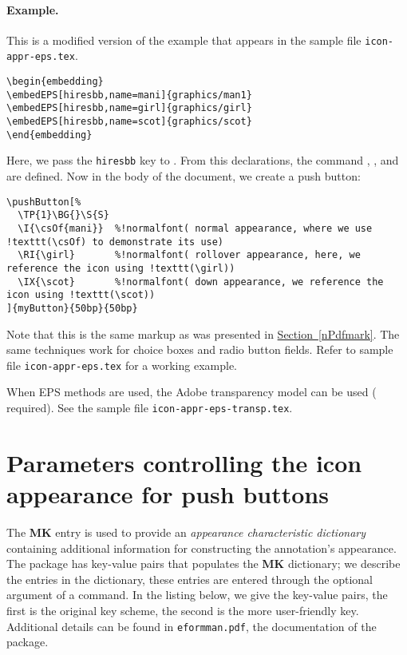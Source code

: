 \documentclass{article}
\begin{document}
\paragraph*{Example.} This is a modified version of the example that appears in the sample
file \texttt{icon-appr-eps.tex}.
\begin{Verbatim}[xleftmargin=\parindent,fontsize=\small]
\begin{embedding}
\embedEPS[hiresbb,name=mani]{graphics/man1}
\embedEPS[hiresbb,name=girl]{graphics/girl}
\embedEPS[hiresbb,name=scot]{graphics/scot}
\end{embedding}
\end{Verbatim}
Here, we pass the \texttt{hiresbb} key to .
From this declarations, the command , , and  are
defined. Now in the body of the document, we create a push button:
\begin{Verbatim}[xleftmargin=\parindent,commandchars=!(),fontsize=\small]
\pushButton[%
  \TP{1}\BG{}\S{S}
  \I{\csOf{mani}}  %!normalfont( normal appearance, where we use !texttt(\csOf) to demonstrate its use)
  \RI{\girl}       %!normalfont( rollover appearance, here, we reference the icon using !texttt(\girl))
  \IX{\scot}       %!normalfont( down appearance, we reference the icon using !texttt(\scot))
]{myButton}{50bp}{50bp}
\end{Verbatim}
Note that this is the same markup as was presented in \hyperref[nPdfmark]{Section~\ref*{nPdfmark}}.
The same techniques work for choice boxes and radio button fields. Refer to sample file \texttt{icon-appr-eps.tex}
for a working example.

When EPS methods are used, the Adobe transparency model can be used ( required). See
the sample file \texttt{icon-appr-eps-transp.tex}.

\section{Parameters controlling the icon appearance for push buttons}\label{parameters}

The \textbf{MK} entry is used to provide an \emph{appearance characteristic
dictionary} containing additional information for constructing the
annotation's appearance. The  package has key-value pairs that
populates the \textbf{MK} dictionary; we describe the entries in the
dictionary, these entries are entered through the optional argument of a
 command. In the listing below, we give the key-value pairs,
the first is the original key scheme, the second is the more user-friendly
key. Additional details can be found in \texttt{eformman.pdf}, the documentation
of the  package.
\end{document}
